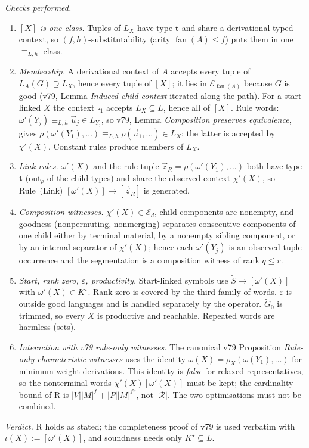 \documentclass[11pt]{article}
\theoremstyle{definition}
\theoremstyle{remark}
\newcommand{\tuple}[1]{\vec{#1}}
\newcommand{\blank}{\square}
\newcommand{\fan}{\operatorname{fan}}
\begin{document}
\emph{Checks performed.}
\begin{enumerate}[label=(R\arabic*)]
\item \emph{$[X]$ is one class.}  Tuples of $L_X$ have type $\mathbf t$ and
share a derivational typed context, so $(f,h)$-substitutability (arity
$\fan(A)\le f$) puts them in one $\equiv_{L,h}$-class.
\item \emph{Membership.}  A derivational context of $A$ accepts every tuple
of $L_A(G)\supseteq L_X$, hence every tuple of $[X]$; it lies in
$\mathcal E_{\fan(A)}$ because $G$ is good (v79, Lemma \emph{Induced child
context} iterated along the path).  For a start-linked $X$ the context
$\blank_1$ accepts $L_X\subseteq L$, hence all of $[X]$.  Rule words:
$\omega'(Y_j)\equiv_{L,h}\tuple u_j\in L_{Y_j}$, so v79, Lemma
\emph{Composition preserves equivalence}, gives
$\rho(\omega'(Y_1),\ldots)\equiv_{L,h}\rho(\tuple u_1,\ldots)\in L_X$; the
latter is accepted by $\chi'(X)$.  Constant rules produce members of $L_X$.
\item \emph{Link rules.}  $\omega'(X)$ and the rule tuple
$\tuple z_R=\rho(\omega'(Y_1),\ldots)$ both have type $\mathbf t$
($\mathrm{out}_\rho$ of the child types) and share the observed context
$\chi'(X)$, so Rule~(Link) $[\omega'(X)]\to[\tuple z_R]$ is generated.
\item \emph{Composition witnesses.}  $\chi'(X)\in\mathcal E_d$, child
components are nonempty, and goodness (nonpermuting, nonmerging) separates
consecutive components of one child either by terminal material, by a
nonempty sibling component, or by an internal separator of $\chi'(X)$;
hence each $\omega'(Y_j)$ is an observed tuple occurrence and the
segmentation is a composition witness of rank $q\le r$.
\item \emph{Start, rank zero, $\varepsilon$, productivity.}  Start-linked
symbols use $\widetilde S\to[\omega'(X)]$ with $\omega'(X)\in K^\star$.
Rank zero is covered by the third family of words.  $\varepsilon$ is outside
good languages and is handled separately by the operator.  $\widetilde G_0$
is trimmed, so every $X$ is productive and reachable.  Repeated words are
harmless (sets).
\item \emph{Interaction with v79 rule-only witnesses.}  The canonical v79
Proposition \emph{Rule-only characteristic witnesses} uses the identity
$\omega(X)=\rho_X(\omega(Y_1),\ldots)$ for minimum-weight derivations.  This
identity is \emph{false} for relaxed representatives, so the nonterminal
words $\chi'(X)[\omega'(X)]$ must be kept; the cardinality bound of R is
$|V||M|^f+|P||M|^{fr}$, not $|\mathcal R|$.  The two optimisations must
not be combined.
\end{enumerate}
\emph{Verdict.}  R holds as stated; the completeness proof of v79 is used
verbatim with $\iota(X):=[\omega'(X)]$, and soundness needs only
$K^\star\subseteq L$.
\end{document}
